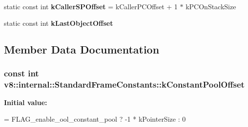 \begin{DoxyCompactItemize}
\item 
\hypertarget{classv8_1_1internal_1_1_standard_frame_constants_ab3dda78dbe16572e2ee47f065f2f0eb6}{}static const int {\bfseries k\+Caller\+S\+P\+Offset} = k\+Caller\+P\+C\+Offset + 1 $\ast$ k\+P\+C\+On\+Stack\+Size\label{classv8_1_1internal_1_1_standard_frame_constants_ab3dda78dbe16572e2ee47f065f2f0eb6}

\item 
static const int {\bfseries k\+Last\+Object\+Offset}
\end{DoxyCompactItemize}


\subsection{Member Data Documentation}
\hypertarget{classv8_1_1internal_1_1_standard_frame_constants_a9839de37e78a2f041d7dbdbfc9507feb}{}
\subsubsection[{k\+Constant\+Pool\+Offset}]{\setlength{\rightskip}{0pt plus 5cm}const int v8\+::internal\+::\+Standard\+Frame\+Constants\+::k\+Constant\+Pool\+Offset\hspace{0.3cm}{\ttfamily [static]}}\label{classv8_1_1internal_1_1_standard_frame_constants_a9839de37e78a2f041d7dbdbfc9507feb}
{\bfseries Initial value\+:}
\begin{DoxyCode}
= FLAG\_enable\_ool\_constant\_pool ?
                                           -1 * kPointerSize : 0
\end{DoxyCode}
\hypertarget{classv8_1_1internal_1_1_standard_frame_constants_accfa2178667c045c4fb86eb447c3f1e4}{}
